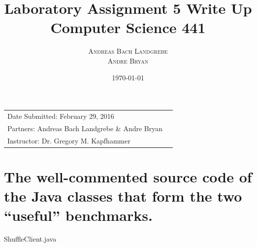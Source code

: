 \documentclass{article}
\title{Laboratory Assignment 5 Write Up \\ Computer Science 441} %
\author{\textsc{Andreas Bach Landgrebe} \\
\textsc{Andre Bryan}} %
\date{\today} %
\begin{document}
\maketitle %

\begin{center}
\begin{tabular}{l r}
Date Submitted:  February 29, 2016 \\ %
Partners:  Andreas Bach Landgrebe \& Andre Bryan \\ %
Instructor:  Dr. Gregory M. Kapfhammer  %
\end{tabular}
\end{center}



\section{The well-commented source code of the Java classes that form the two ``useful” benchmarks.}

ShuffleClient.java
\end{document}
